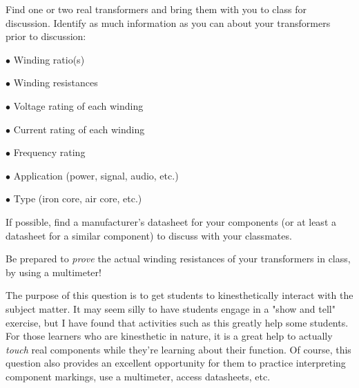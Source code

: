 

Find one or two real transformers and bring them with you to class for discussion.  Identify as much information as you can about your transformers prior to discussion:

\medskip
\item{$\bullet$} Winding ratio(s)
\item{$\bullet$} Winding resistances
\item{$\bullet$} Voltage rating of each winding
\item{$\bullet$} Current rating of each winding
\item{$\bullet$} Frequency rating
\item{$\bullet$} Application (power, signal, audio, etc.)
\item{$\bullet$} Type (iron core, air core, etc.)
\medskip







If possible, find a manufacturer's datasheet for your components (or at least a datasheet for a similar component) to discuss with your classmates.

Be prepared to {\it prove} the actual winding resistances of your transformers in class, by using a multimeter!







The purpose of this question is to get students to kinesthetically interact with the subject matter.  It may seem silly to have students engage in a "show and tell" exercise, but I have found that activities such as this greatly help some students.  For those learners who are kinesthetic in nature, it is a great help to actually {\it touch} real components while they're learning about their function.  Of course, this question also provides an excellent opportunity for them to practice interpreting component markings, use a multimeter, access datasheets, etc.



